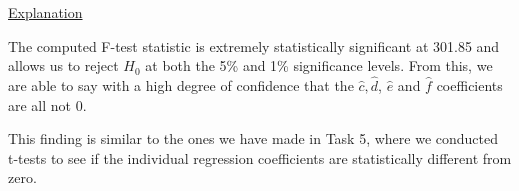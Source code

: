 \documentclass[a4paper]{article}
\begin{document}
\underline{Explanation}

The computed F-test statistic is extremely statistically significant at 301.85 and allows us to reject $H_0$ at both the 5\% and 1\% significance levels. From this, we are able to say with a high degree of confidence that the $\hat{c}, \hat{d}$, $\hat{e}$ and $\hat{f}$ coefficients are all not 0. 

This finding is similar to the ones we have made in Task 5, where we conducted t-tests to see if the individual regression coefficients are statistically different from zero.
\end{document}

